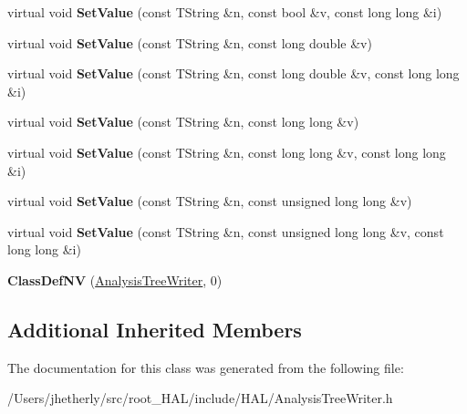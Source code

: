 \begin{DoxyCompactItemize}
\item 
\hypertarget{class_h_a_l_1_1_analysis_tree_writer_a85b8b7790bb9392ed1d865daab3248d7}{virtual void {\bfseries Set\+Value} (const T\+String \&n, const bool \&v, const long long \&i)}\label{class_h_a_l_1_1_analysis_tree_writer_a85b8b7790bb9392ed1d865daab3248d7}

\item 
\hypertarget{class_h_a_l_1_1_analysis_tree_writer_a2e68fdea10ca87aebab5332c2b680286}{virtual void {\bfseries Set\+Value} (const T\+String \&n, const long double \&v)}\label{class_h_a_l_1_1_analysis_tree_writer_a2e68fdea10ca87aebab5332c2b680286}

\item 
\hypertarget{class_h_a_l_1_1_analysis_tree_writer_ae4fbd939b2edfc2c3859ca24f635a475}{virtual void {\bfseries Set\+Value} (const T\+String \&n, const long double \&v, const long long \&i)}\label{class_h_a_l_1_1_analysis_tree_writer_ae4fbd939b2edfc2c3859ca24f635a475}

\item 
\hypertarget{class_h_a_l_1_1_analysis_tree_writer_a73bed978557c7222f4c88b71c1b74424}{virtual void {\bfseries Set\+Value} (const T\+String \&n, const long long \&v)}\label{class_h_a_l_1_1_analysis_tree_writer_a73bed978557c7222f4c88b71c1b74424}

\item 
\hypertarget{class_h_a_l_1_1_analysis_tree_writer_abc1b0d49980dfe48e99cf3c03f271bb3}{virtual void {\bfseries Set\+Value} (const T\+String \&n, const long long \&v, const long long \&i)}\label{class_h_a_l_1_1_analysis_tree_writer_abc1b0d49980dfe48e99cf3c03f271bb3}

\item 
\hypertarget{class_h_a_l_1_1_analysis_tree_writer_ad7fc39378d544f275cbb19145def8fbf}{virtual void {\bfseries Set\+Value} (const T\+String \&n, const unsigned long long \&v)}\label{class_h_a_l_1_1_analysis_tree_writer_ad7fc39378d544f275cbb19145def8fbf}

\item 
\hypertarget{class_h_a_l_1_1_analysis_tree_writer_ae71437812731ea60b3375c771ff912e1}{virtual void {\bfseries Set\+Value} (const T\+String \&n, const unsigned long long \&v, const long long \&i)}\label{class_h_a_l_1_1_analysis_tree_writer_ae71437812731ea60b3375c771ff912e1}

\item 
\hypertarget{class_h_a_l_1_1_analysis_tree_writer_a77da0342b01b89846c418b825d3a9d99}{{\bfseries Class\+Def\+N\+V} (\hyperlink{class_h_a_l_1_1_analysis_tree_writer}{Analysis\+Tree\+Writer}, 0)}\label{class_h_a_l_1_1_analysis_tree_writer_a77da0342b01b89846c418b825d3a9d99}

\end{DoxyCompactItemize}
\subsection*{Additional Inherited Members}


The documentation for this class was generated from the following file\+:\begin{DoxyCompactItemize}
\item 
/\+Users/jhetherly/src/root\+\_\+\+H\+A\+L/include/\+H\+A\+L/Analysis\+Tree\+Writer.\+h\end{DoxyCompactItemize}
